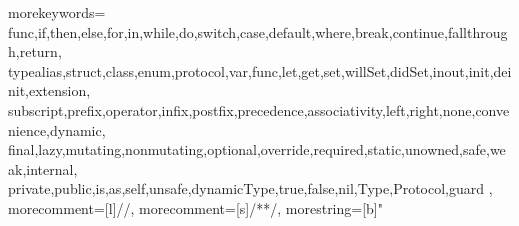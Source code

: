 %
\newcommand{\inputfiledox}[5]
{
  \begin{minipage}[t]{0.70\textwidth-0pt}
    {\noindent \bfseries \sffamily \large #1\\}
    {\noindent \small #2\\}
    \end{minipage}
    \hfill
    \begin{minipage}[t]{0.28\textwidth-0pt}
    \begin{flushright}
    \noindent \sffamily \color{dark-gray} \Huge #4
    \end{flushright}
  \end{minipage}

  \ifx&#2&%
  \vspace{-20pt}
  \else
  \vspace{-5pt}
  \fi

  \hrule
  
  [language={#5},
  morecomment={[s][\color{doxy-color}\bfseries]{/**}{*/}},
  morecomment={[l][\color{doxy-color}\bfseries]{//!}},
  morecomment={[l][\color{doxy-color}\bfseries]{///}}]
  {#3}
}

{
  morekeywords={
    func,if,then,else,for,in,while,do,switch,case,default,where,break,continue,fallthrough,return,
    typealias,struct,class,enum,protocol,var,func,let,get,set,willSet,didSet,inout,init,deinit,extension,
    subscript,prefix,operator,infix,postfix,precedence,associativity,left,right,none,convenience,dynamic,
    final,lazy,mutating,nonmutating,optional,override,required,static,unowned,safe,weak,internal,
    private,public,is,as,self,unsafe,dynamicType,true,false,nil,Type,Protocol,guard
  },
  morecomment=[l]{//}, %
  morecomment=[s]{/*}{*/}, %
  morestring=[b]" %
}
